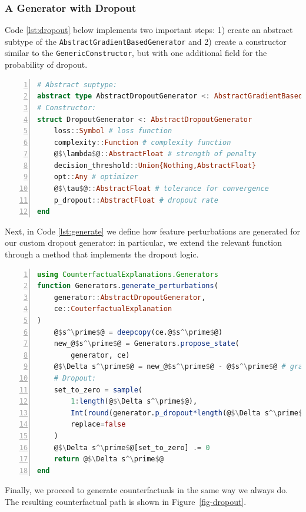 \documentclass[
  letterpaper,
  DIV=11,
  numbers=noendperiod]{scrartcl}
\begin{document}
\hypertarget{a-generator-with-dropout}{%
\subsubsection{A Generator with
Dropout}\label{a-generator-with-dropout}}

Code \ref{lst:dropout} below implements two important steps: 1) create
an abstract subtype of the \texttt{AbstractGradientBasedGenerator} and
2) create a constructor similar to the \texttt{GenericConstructor}, but
with one additional field for the probability of dropout.

\begin{lstlisting}[language=Julia, escapechar=@, numbers=left, label={lst:dropout}, caption={Building a custom generator with dropout.}]
# Abstract suptype:
abstract type AbstractDropoutGenerator <: AbstractGradientBasedGenerator end
# Constructor:
struct DropoutGenerator <: AbstractDropoutGenerator
    loss::Symbol # loss function
    complexity::Function # complexity function
    @$\lambda$@::AbstractFloat # strength of penalty
    decision_threshold::Union{Nothing,AbstractFloat} 
    opt::Any # optimizer
    @$\tau$@::AbstractFloat # tolerance for convergence
    p_dropout::AbstractFloat # dropout rate
end
\end{lstlisting}

Next, in Code \ref{lst:generate} we define how feature perturbations are
generated for our custom dropout generator: in particular, we extend the
relevant function through a method that implements the dropout logic.

\begin{lstlisting}[language=Julia, escapechar=@, numbers=left, label={lst:generate}, caption={Generating feature perturbations with dropout.}]
using CounterfactualExplanations.Generators
function Generators.generate_perturbations(
    generator::AbstractDropoutGenerator, 
    ce::CouterfactualExplanation
)
    @$s^\prime$@ = deepcopy(ce.@$s^\prime$@)
    new_@$s^\prime$@ = Generators.propose_state(
        generator, ce)
    @$\Delta s^\prime$@ = new_@$s^\prime$@ - @$s^\prime$@ # gradient step
    # Dropout:
    set_to_zero = sample(
        1:length(@$\Delta s^\prime$@),
        Int(round(generator.p_dropout*length(@$\Delta s^\prime$@))),
        replace=false
    )
    @$\Delta s^\prime$@[set_to_zero] .= 0
    return @$\Delta s^\prime$@
end
\end{lstlisting}

Finally, we proceed to generate counterfactuals in the same way we
always do. The resulting counterfactual path is shown in
Figure~\ref{fig-dropout}.
\end{document}
